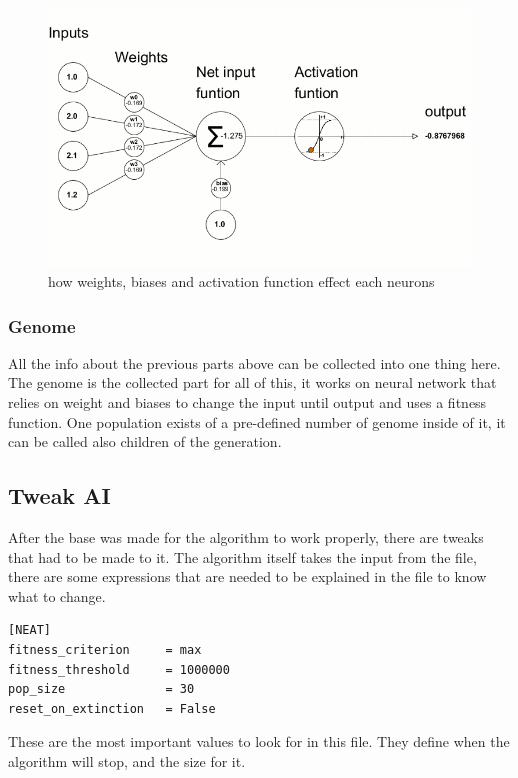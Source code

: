 \begin{figure}[H]
	\centering
	\includegraphics[width=0.7\linewidth]{usedImages/neuronsNN}
	\caption{how weights, biases and activation function effect each neurons}
	\label{fig:neuronsnn}
\end{figure}

\subsubsection{Genome}\label{sec:genome}
All the info about the previous parts above can be collected into one thing here. The genome is the collected part for all of this, it works on neural network that relies on weight and biases to change the input until output and uses a fitness function. One population exists of a pre-defined number of genome inside of it, it can be called also children of the generation.



\subsection{Tweak AI}\label{tweak-ai}

After the base was made for the algorithm to work properly, there are tweaks that had to be made to it. The algorithm itself takes the input from the  file, there are some expressions that are needed to be explained in the file to know what to change.

\begin{listing}[H]
\begin{verbatim}
[NEAT]
fitness_criterion     = max
fitness_threshold     = 1000000
pop_size              = 30
reset_on_extinction   = False
\end{verbatim}
\end{listing}

These are the most important values to look for in this file. They define when the algorithm will stop, and the size for it.

